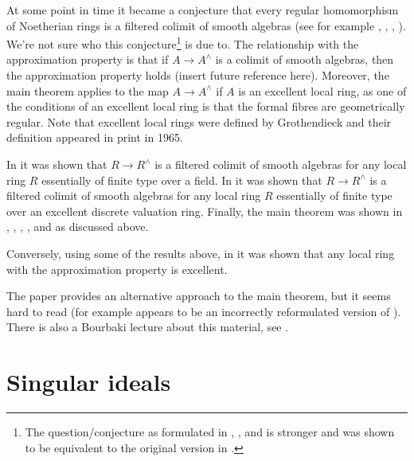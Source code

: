 \medskip\noindent
At some point in time it became a conjecture
that every regular homomorphism of Noetherian rings is a
filtered colimit of smooth algebras (see for example
\cite{Raynaud-Rennes}, \cite{popescu-global}, \cite{Artin-power-series},
\cite{Artin-Denef}). We're not sure who this conjecture\footnote{The
question/conjecture as formulated in \cite{Artin-power-series},
\cite{Artin-Denef}, and \cite{popescu-global} is stronger and was shown
to be equivalent to the original version in \cite{Cipu}.}
is due to. The relationship with the approximation property is that if
$A \to A^\wedge$ is a colimit of smooth algebras, then the approximation
property holds (insert future reference here). Moreover, the main theorem
applies to the map $A \to A^\wedge$ if $A$ is an excellent local ring, as one
of the conditions of an excellent local ring is that the formal
fibres are geometrically regular. Note that excellent local rings
were defined by Grothendieck and their definition appeared in
print in 1965.

\medskip\noindent
In \cite{Artin-power-series} it was shown that
$R \to R^\wedge$ is a filtered colimit of smooth algebras for any
local ring $R$ essentially of finite type over a field.
In \cite{Rotthaus-Artin} it was shown that $R \to R^\wedge$
is a filtered colimit of smooth algebras for any local ring $R$
essentially of finite type over an excellent discrete valuation ring.
Finally, the main theorem was shown in
\cite{popescu-GND}, \cite{popescu-GNDA}, \cite{popescu-letter}, 
\cite{Ogoma}, and \cite{swan} as discussed above.

\medskip\noindent
Conversely, using some of the results above, in \cite{Rotthaus-excellent}
it was shown that any local ring with the approximation property is excellent.

\medskip\noindent
The paper \cite{Spivakovsky} provides an alternative approach to the
main theorem, but it seems hard to read (for example
\cite[Lemma 5.2]{Spivakovsky} appears to be an incorrectly reformulated
version of \cite[Lemma 3]{Elkik}). There is also a Bourbaki
lecture about this material, see \cite{Teissier}.












\section{Singular ideals}
\label{section-singular-ideal}

